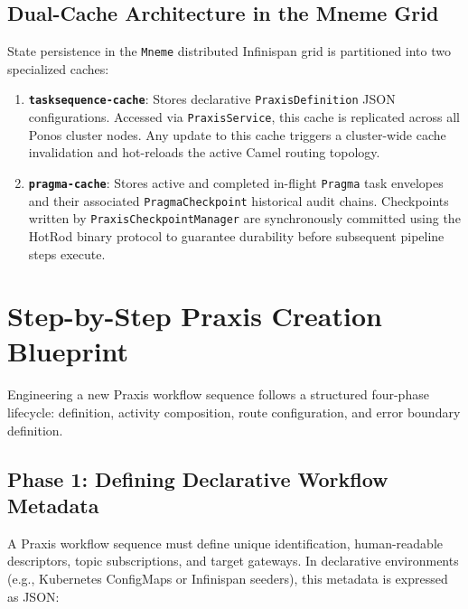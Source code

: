 \subsection{Dual-Cache Architecture in the Mneme Grid}
\label{subsec:praxis_dual_cache}

State persistence in the \texttt{Mneme} distributed Infinispan grid is partitioned into two specialized caches:
\begin{enumerate}
    \item \textbf{\texttt{tasksequence-cache}}: Stores declarative \texttt{PraxisDefinition} JSON configurations. Accessed via \texttt{PraxisService}, this cache is replicated across all Ponos cluster nodes. Any update to this cache triggers a cluster-wide cache invalidation and hot-reloads the active Camel routing topology.
    \item \textbf{\texttt{pragma-cache}}: Stores active and completed in-flight \texttt{Pragma} task envelopes and their associated \texttt{PragmaCheckpoint} historical audit chains. Checkpoints written by \texttt{PraxisCheckpointManager} are synchronously committed using the HotRod binary protocol to guarantee durability before subsequent pipeline steps execute.
\end{enumerate}

\section{Step-by-Step Praxis Creation Blueprint}
\label{sec:praxis_creation_blueprint}

Engineering a new Praxis workflow sequence follows a structured four-phase lifecycle: definition, activity composition, route configuration, and error boundary definition.

\subsection{Phase 1: Defining Declarative Workflow Metadata}
\label{subsec:blueprint_metadata}

A Praxis workflow sequence must define unique identification, human-readable descriptors, topic subscriptions, and target gateways. In declarative environments (e.g., Kubernetes ConfigMaps or Infinispan seeders), this metadata is expressed as JSON:

